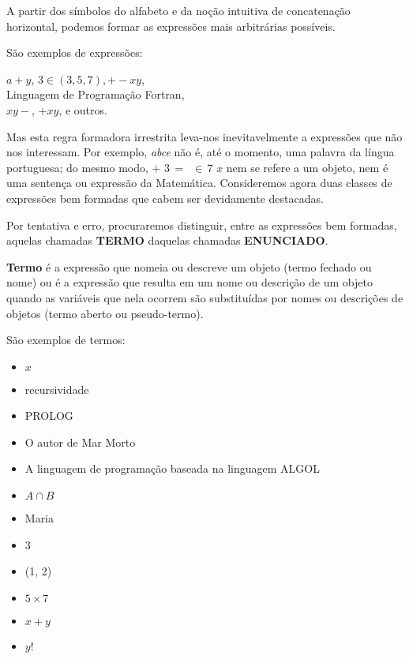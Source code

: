 \documentclass[
	14pt,				%
	twoside,			%
	a4paper,			%
	english,			%
	french,				%
	spanish,			%
	brazil,				%
    ]{abntex2}
\begin{document}
A partir dos símbolos do alfabeto e da noção intuitiva de concatenação horizontal, podemos formar as expressões mais arbitrárias possíveis.

São exemplos de expressões:

\vskip 1cm

\hskip 2.5cm $a + y$, $3 \in (3, 5, 7), +-xy$,\\
\hskip 2.5cm Linguagem de Programação Fortran,\\
\hskip 2.5cm $xy-$, $+xy$, e outros.

\newpage

Mas esta regra formadora irrestrita leva-nos inevitavelmente a expressões que não nos interessam.
Por exemplo, \textit{abce} não é, até o momento, uma palavra da língua portuguesa; do mesmo modo, $+\,\, 3 \,=\,\,\, \in\, 7\,\, x$ nem se refere a um objeto, nem é uma sentença ou expressão da Matemática.
Consideremos agora duas classes de expressões bem formadas que cabem ser devidamente destacadas.

Por tentativa e erro, procuraremos distinguir, entre as expressões bem formadas, aquelas chamadas \textbf{TERMO} daquelas chamadas \textbf{ENUNCIADO}.

\vskip 0.5cm

\begin{addmargin}[2.0cm]{0cm}
\textbf{Termo} é a expressão que nomeia ou descreve um objeto (termo fechado ou nome) ou é a expressão que resulta em um nome ou descrição de um objeto quando as variáveis que nela ocorrem são substituídas por nomes ou descrições de objetos (termo aberto ou pseudo-termo).
\end{addmargin}

\vskip 0.5cm


\noindent São exemplos de termos:

\begin{itemize}[itemsep=0.01pt]
\renewcommand\labelitemi{\textbf{-}}
    \item $x$
    \item recursividade
    \item PROLOG
    \item  O autor de Mar Morto
    \item  A linguagem de programação baseada na linguagem ALGOL
    \item $A \cap B$
    \item Maria
    \item 3
    \item (1, 2)
    \item $5 \times 7$
    \item $x + y$
    \item $y!$

\end{itemize}
\end{document}
